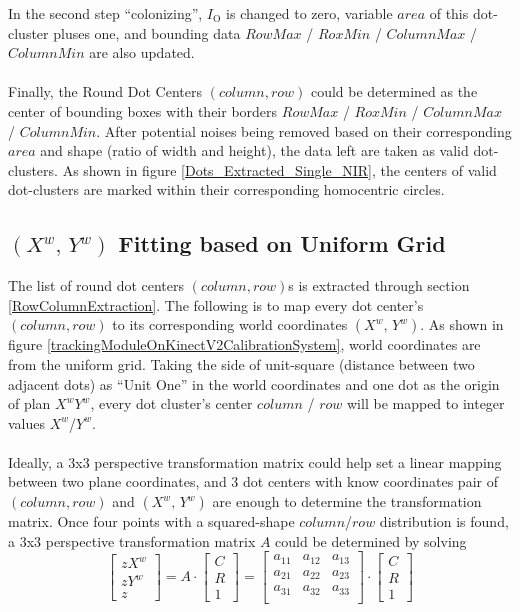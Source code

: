 %
In the second step \enquote{colonizing},  \(I_{\text{O}}\) is changed to zero, variable \(area\) of this dot-cluster pluses one, and bounding data \(RowMax\) / \(RoxMin\) / \(ColumnMax\) / \(ColumnMin\) are also updated.%
\\\\%
Finally, the Round Dot Centers \((column, row)\) could be determined as the center of bounding boxes with their borders \(RowMax\) / \(RoxMin\) / \(ColumnMax\) / \(ColumnMin\). After potential noises being removed based on their corresponding \(area\) and shape (ratio of width and height), the data left are taken as valid dot-clusters. As shown in figure \ref{Dots_Extracted_Single_NIR}, the centers of valid dot-clusters are marked within their corresponding homocentric circles.
%
%
\subsection{\((X^w, \,Y^w)\) Fitting based on Uniform Grid}
\label{uniformGridFittingXY}
%
The list of round dot centers \((column, row)\)s is extracted through section \ref{RowColumnExtraction}. The following is to map every dot center's \((column, row)\) to its corresponding world coordinates \((X^w, \,Y^w)\). As shown in figure \ref{trackingModuleOnKinectV2CalibrationSystem}, world coordinates are from the uniform grid. Taking the side of unit-square (distance between two adjacent dots) as \enquote{Unit One} in the world coordinates and one dot as the origin of plan \(X^wY^w\), every dot cluster's center \(column\) / \(row\) will be mapped to integer values \(X^w\)/\(Y^w\). %
\\\\%
Ideally, a 3x3 perspective transformation matrix could help set a linear mapping between two plane coordinates, and 3 dot centers with know coordinates pair of \((column, row)\) and \((X^w, \,Y^w)\) are enough to determine the transformation matrix. Once four points with a squared-shape \(column\)/\(row\) distribution is found, a 3x3 perspective transformation matrix \(A\) could be determined by solving%
%
\begin{equation}
%
\left[ \begin{array}{c} %
zX^w \\ zY^w \\ z \end{array} \right] %
= %
A\cdot \left[ \begin{array}{c} %
C \\ R \\ 1 \end{array} \right] %
= %
\begin{bmatrix} 
a_{11} & a_{12} & a_{13} \\
a_{21} & a_{22} & a_{23} \\
a_{31} & a_{32} & a_{33} \\
\end{bmatrix}%
\cdot \left[ \begin{array}{c} %
C \\ R \\ 1 \end{array} \right] %
%
\label{perspectiveDistortionCorrectionEquation}
\end{equation}%
